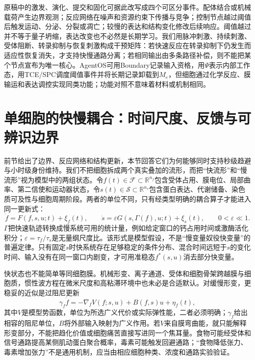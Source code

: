 原稿中的激发、演化、提交和固化可据此改写成四个可区分事件。配体结合或机械载荷产生边界观测；反应网络在噪声和资源约束下传播与竞争；控制节点越过阈值后触发运动、分泌、分裂或凋亡；较慢的表达和结构变化修改后续响应。阈值越过并不等于量子坍缩，表达改变也不必然是长期学习。我们用脉冲刺激、持续刺激、受体阻断、转录抑制与恢复刺激构成干预矩阵：若快速反应在转录抑制下仍发生而适应性恢复消失，才支持快慢通路分离；若相同输出由多条路径补偿，则不能把某个节点宣布为唯一核心。AgentOS可用Boundary记录输入资格，用$\Psi$表示内部工作态，用TCE/SPC调度阈值事件并将长期记录卸载到$M_e$，但细胞通过化学反应、膜输运和表达调控实现同类功能；功能对照不意味着材料或机制相同。

\section{单细胞的快慢耦合：时间尺度、反馈与可辨识边界}
\label{sec:dual_manifold_coupling}

前节给出了边界、反应网络和结构更新，本节回答它们为何能够同时支持秒级趋避与小时级身份维持。我们不把细胞拆成两个真实叠加的流形，而把“快流形”和“慢流形”视为模型中的两组状态。令$f(t)\in\mathcal F\subset\mathbb R^{n_f}$包含受体占用、膜电位、局部曲率、第二信使和运动器状态，令$s(t)\in\mathcal S\subset\mathbb R^{n_s}$包含蛋白表达、代谢储备、染色质可及性与细胞周期阶段。两者的单位不同，只有经类型明确的耦合算子才能进入同一更新式：
\begin{equation}
 \dot f=F(f,s,u;t)+\xi_f(t),\qquad
 \dot s=\varepsilon G(s,\Gamma(f),u;t)+\xi_s(t),\qquad 0<\varepsilon\ll1.
\end{equation}
$\Gamma$把快速轨迹转换成慢系统可用的统计量，例如给定窗口的钙占用时间或激酶活化积分；$\varepsilon=\tau_f/\tau_s$是无量纲尺度比。该形式是模型假设，不是“慢变量奴役快变量”的普遍定律。只有固定$s$时快系统存在足够稳定的条件分布、混合时间远短于$s$的变化时间、输入没有在同一窗口内剧变，才可用准稳态$f^*(s,u)$消去部分快变量。

快状态也不能简单等同细胞膜。机械形变、离子通道、受体和细胞骨架跨越膜与细胞质，惯性波方程在微米尺度和高粘滞环境中也未必是合适默认。对缓慢形变，更稳妥的近似是过阻尼更新
\begin{equation}
 \gamma_f\dot f=-\nabla_f V(f;s,u)+B(f,s)u+\eta_f(t),
\end{equation}
其中$V$是模型势函数，单位为所选广义代价或实际弹性能，二者必须明确；$\gamma_f$给出相容的阻尼单位，$B$将外部输入映射为广义作用。若$V$来自膜弯曲能，就只能解释形变部分，不能把趋化价值或细胞痛苦直接写进同一个焦耳量。食物可能经受体和信号通路提高某侧肌动蛋白聚合概率，毒素可能触发回避通路；“食物降低张力、毒素增加张力”不是通用机制，应当由相应细胞种类、浓度和通路实验验证。

